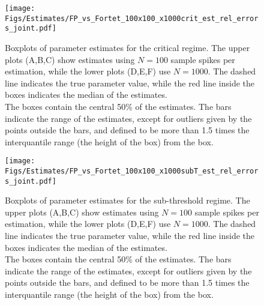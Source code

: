 \begin{figure}[p]
\begin{center}
\texttt{[image: Figs/Estimates/FP\_vs\_Fortet\_100x100\_x1000crit\_est\_rel\_errors\_joint.pdf]}
\caption{Boxplots of parameter estimates for the
critical regime.
The upper plots (A,B,C) show estimates using $N=100$ sample spikes per
estimation, while the lower plots (D,E,F) use $N=1000$. The dashed line
indicates the true parameter value, while the red line inside the boxes
indicates the median of the estimates.
\\
The boxes contain the central 50\% of the estimates. The bars indicate
the range of the estimates, except for outliers given by the points
outside the bars, and defined to be more than 1.5 times the
interquantile range (the height of the box) from the box.}  
\label{fig:comprehensive_test_crit_relerrors}
\end{center}    
\end{figure} 
\begin{figure}[p]  
\begin{center}
\texttt{[image: Figs/Estimates/FP\_vs\_Fortet\_100x100\_x1000subT\_est\_rel\_errors\_joint.pdf]}
\caption{Boxplots of parameter estimates for the 
sub-threshold regime.
The upper plots (A,B,C) show estimates using $N=100$ sample spikes per
estimation, while the lower plots (D,E,F) use $N=1000$. The dashed line
indicates the true parameter value, while the red line inside the boxes
indicates the median of the estimates.
\\
The boxes contain the central 50\% of the estimates. The bars indicate
the range of the estimates, except for outliers given by the points
outside the bars, and defined to be more than 1.5 times the
interquantile range (the height of the box) from the box.}
\label{fig:comprehensive_test_SubT_relerrors}
\end{center}
\end{figure}
